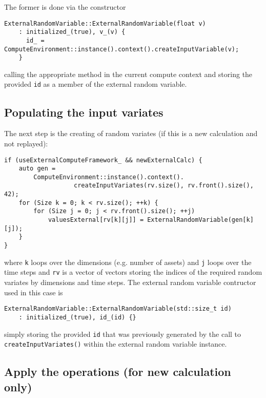 \documentclass[12pt, a4paper]{article}
\begin{document}
The former is done via the constructor

\begin{verbatim}
ExternalRandomVariable::ExternalRandomVariable(float v)
    : initialized_(true), v_(v) {
      id_ = ComputeEnvironment::instance().context().createInputVariable(v);
    }
\end{verbatim}

calling the appropriate method in the current compute context and storing the provided \verb+id+ as a member of the
external random variable.

\subsection{Populating the input variates}

The next step is the creating of random variates (if this is a new calculation and not replayed):

\begin{verbatim}
if (useExternalComputeFramework_ && newExternalCalc) {
    auto gen =
        ComputeEnvironment::instance().context().
                   createInputVariates(rv.size(), rv.front().size(), 42);
    for (Size k = 0; k < rv.size(); ++k) {
        for (Size j = 0; j < rv.front().size(); ++j)
            valuesExternal[rv[k][j]] = ExternalRandomVariable(gen[k][j]);
    }
}
\end{verbatim}

where \verb+k+ loops over the dimensions (e.g. number of assets) and \verb+j+ loops over the time steps and \verb+rv+ is
a vector of vectors storing the indices of the required random variates by dimensions and time steps. The external
random variable contructor used in this case is

\begin{verbatim}
ExternalRandomVariable::ExternalRandomVariable(std::size_t id)
    : initialized_(true), id_(id) {}
\end{verbatim}

simply storing the provided \verb+id+ that was previously generated by the call to \verb+createInputVariates()+ within
the external random variable instance.

\subsection{Apply the operations (for new calculation only)}
\end{document}

